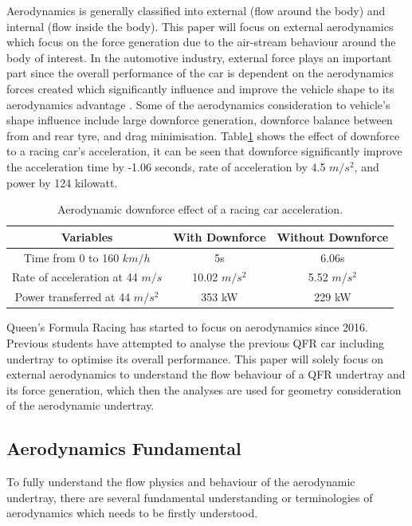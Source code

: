 \noindent Aerodynamics is generally classified into external (flow around  the body) and internal (flow inside the body). This paper will focus on external aerodynamics which focus on the force generation due to the air-stream behaviour around the body of interest. In the automotive industry, external force plays an important part since the overall performance of the car is dependent on the aerodynamics forces created which significantly influence and improve the vehicle shape to its aerodynamics advantage \cite{Scibor-Rylski1984RoadAerodynamics}. Some of the aerodynamics consideration to vehicle's shape influence include large downforce generation, downforce balance between from and rear tyre, and drag minimisation. Table\ref{Table1} shows the effect of downforce to a racing car's acceleration, it can be seen that downforce significantly improve the acceleration time by -1.06 seconds, rate of acceleration by 4.5 $m/s^2$, and power by 124 kilowatt. 
\begin{table}[!ht]
\caption{\label{Table1} Aerodynamic downforce effect of a racing car acceleration\cite{Scibor-Rylski1984RoadAerodynamics}.}
\begin{center}
 \begin{tabular}{||c| c c ||} 
 \hline
 Variables & With Downforce & Without Downforce \\ [0.5ex] 
 \hline\hline
 Time from 0 to 160 $km/h$ & 5s & 6.06s \\ 
 \hline
 Rate of acceleration at 44 $m/s$ & 10.02 $m/s^{2}$ & 5.52 $m/s^2$ \\
 \hline
 Power transferred at 44 $m/s^2$ & 353 kW & 229 kW  \\
 \hline
\end{tabular}
\end{center}
\end{table}
\noindent Queen's Formula Racing has started to focus on aerodynamics since 2016. Previous students have attempted to analyse the previous QFR car including undertray to optimise its overall performance.  This paper will solely focus on external aerodynamics to understand the flow behaviour of a QFR undertray and its force generation, which then the analyses are used for geometry consideration of the aerodynamic undertray.

\subsection{Aerodynamics Fundamental}
To fully understand the flow physics and behaviour of the aerodynamic undertray, there are several fundamental understanding or terminologies of aerodynamics which needs to be firstly understood.

